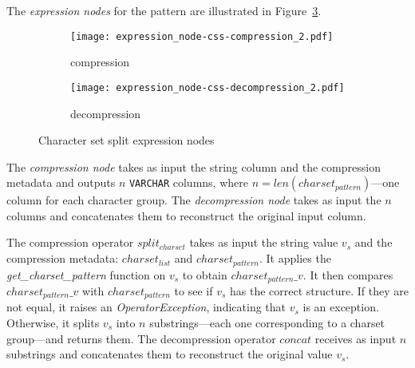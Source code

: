 The \textit{expression nodes} for the  pattern are illustrated in Figure~\ref{fig:pd:charsetsplit:exprnode}.

\begin{figure}[h]
  \centering
  \begin{subfigure}[t]{0.49\linewidth}
    \centering
    \texttt{[image: expression\_node-css-compression\_2.pdf]}
    \caption[b]{compression}
    \label{fig:pd:charsetsplit:exprnode:compression}
  \end{subfigure}
  \begin{subfigure}[t]{0.49\linewidth}
    \centering
    \texttt{[image: expression\_node-css-decompression\_2.pdf]}
    \caption[b]{decompression}
    \label{fig:pd:charsetsplit:exprnode:decompression}
  \end{subfigure}
  \caption{Character set split expression nodes}
  \label{fig:pd:charsetsplit:exprnode}
\end{figure}

The \textit{compression node} takes as input the string column and the compression metadata and outputs \(n\) \verb|VARCHAR| columns, where \(n = \mathit{len}(charset_{pattern})\)---one column for each character group. The \textit{decompression node} takes as input the \(n\) columns and concatenates them to reconstruct the original input column.

The compression operator \(split_{charset}\) takes as input the string value \(v_{s}\) and the compression metadata: \(charset_{list}\) and \(charset_{pattern}\). It applies the \textit{get\_charset\_pattern} function on \(v_{s}\) to obtain \(charset_{pattern}\_v\). It then compares \(charset_{pattern}\_v\) with \(charset_{pattern}\) to see if \(v_{s}\) has the correct structure. If they are not equal, it raises an \textit{OperatorException}, indicating that \(v_{s}\) is an exception. Otherwise, it splits \(v_{s}\) into \(n\) substrings---each one corresponding to a charset group---and returns them. The decompression operator \(concat\) receives as input \(n\) substrings and concatenates them to reconstruct the original value \(v_{s}\).

